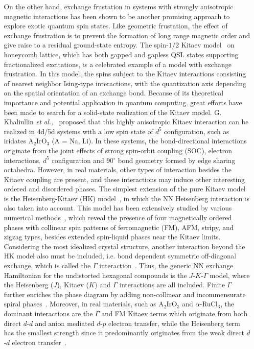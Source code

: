 \documentclass[aps,prb,reprint,amsfonts,amsmath,amssymb,showpacs,groupedaddress,superscriptaddress]{revtex4-1}
\begin{document}
On the other hand, exchange frustation in systems with strongly anisotropic magnetic interactions has been shown to be another promising approach to explore exotic quantum spin states. Like geometric frustation, the effect of exchange frustration is to prevent the formation of long range magnetic order and give raise to a residual ground-state entropy. The spin-$1/2$ Kitaev model~\cite{Kitaev2006} on honeycomb lattice, which has both gapped and gapless QSL states supporting fractionalized excitations, is a celebrated example of a model with exchange frustration. In this model, the spins subject to the Kitaev interactions consisting of nearest neighbor Ising-type interactions, with the quantization axis depending on the spatial orientation of an exchange bond. Because of its theoretical importance and potential application in quantum computing, great efforts have been made to search for a solid-state realization of the Kitaev model. G. Khaliullin \emph{et al.,}~\cite{Khaliullin2005,PhysRevLett.102.017205} proposed that this highly anisotropic Kitaev interaction can be realized in 4d/5d systems with a low spin state of $d^5$ configuration, such as iridates A$_2$IrO$_3$ (A = Na, Li). In these systems, the bond-directional interactions originate from the joint effects of strong spin-orbit coupling (SOC), electron interactions, $d^5$ configuration and 90$^\circ$ bond geometry formed by edge sharing octahedra. However, in real materials, other types of interaction besides the Kitaev coupling are present, and these interactions may induce other interesting ordered and disordered phases. The simplest extension of the pure Kitaev model is the Heisenberg-Kitaev (HK) model~\cite{PhysRevLett.105.027204}, in which the NN Heisenberg interaction is also taken into account. This model has been extensively studied by various numerical methods~\cite{PhysRevLett.110.097204,PhysRevB.83.245104,PhysRevB.84.100406,PhysRevB.90.195102,PhysRevLett.119.157203}, which reveal the presence of four magnetically ordered phases with collinear spin patterns of ferromagnetic (FM), AFM, stripy, and zigzag types, besides extended spin-liquid phases near the Kitaev limits. Considering the most idealized crystal structure, another interaction beyond the HK model also must be included, i.e. bond dependent symmetric off-diagonal exchange, which is called the $\Gamma$ interaction~\cite{PhysRevLett.112.077204,PhysRevB.93.214431,PhysRevB.96.115103}. Thus, the generic NN exchange Hamiltonian for the undistorted hexagonal compounds is the $J$-$K$-$\Gamma$ model, where the Heisenberg ($J$), Kitaev ($K$) and $\Gamma$ interactions are all included. Finite $\Gamma$ further enriches the phase diagram by adding non-collinear and incommensurate spiral phases~\cite{PhysRevLett.112.077204}. Moreover, in real materials, such as A$_2$IrO$_3$ and $\alpha$-RuCl$_{3}$, the dominant interactions are the $\Gamma$ and FM Kitaev terms which originate from both direct $d$-$d$ and anion mediated $d$-$p$ electron transfer, while the Heisenberg term has the smallest strength since it predominantly originates from the weak direct $d$-$d$ electron transfer~\cite{PhysRevLett.112.077204,PhysRevB.93.214431,PhysRevB.96.115103}.
\end{document}
